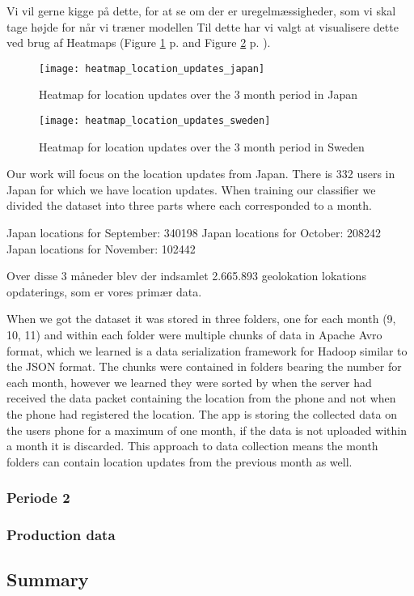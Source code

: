 Vi vil gerne kigge på dette, for at se om der er uregelmæssigheder, som vi skal tage højde for når vi træner modellen
 Til dette har vi valgt at visualisere dette ved brug af Heatmaps (Figure \ref{fig:heatmap_jap} p.  \pageref{fig:heatmap_jap} and Figure \ref{fig:heatmap_swe} p. \pageref{fig:heatmap_swe}). 
\begin{figure}[H]
    \centering
    \texttt{[image: heatmap\_location\_updates\_japan]}
    \caption{Heatmap for location updates over the 3 month period in Japan}
    \label{fig:heatmap_jap}
\end{figure}


\begin{figure}[H]
    \centering
    \texttt{[image: heatmap\_location\_updates\_sweden]}
    \caption{Heatmap for location updates over the 3 month period in Sweden}
    \label{fig:heatmap_swe}
\end{figure}





Our work will focus on the location updates from Japan. There is 332 users in Japan for which we have location updates.
When training our classifier we divided the dataset into three parts where each corresponded to a month.

Japan locations for September: 340198
Japan locations for October: 208242
Japan locations for November: 102442



Over disse 3 måneder blev der indsamlet 2.665.893 geolokation lokations opdaterings, som er vores primær data. 

When we got the dataset it was stored in three folders, one for each month (9, 10, 11) and within each folder were multiple chunks of data in Apache Avro format\cite{apacheavro}, which we learned is a data serialization framework for Hadoop similar to the JSON format. The chunks were contained in folders bearing the number for each month, however we learned they were sorted by when the server had received the data packet containing the location from the phone and not when the phone had registered the location. The app is storing the collected data on the users phone for a maximum of one month, if the data is not uploaded within a month it is discarded. This approach to data collection means the month folders can contain location updates from the previous month as well.


\subsubsection{Periode 2}

\subsubsection{Production data}
\subsection{Summary}